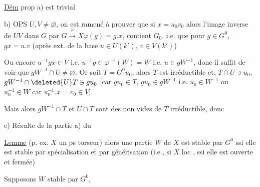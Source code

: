 
\uline{Dém} prop \qquad a) est trivial \qquad{}

b)  OPS $U,V\ne\varnothing$,  on est ramené à prouver que si  $x=u_0v_0$   alors l'image inverse de $UV$ dans $G$ par $G\xrightarrow{\varphi}X$\quad $\varphi(g)=g.x$,  contient $G_0$. i.e. que pour $g\in G^0$, \unsure{\ldots} $gx=u.v$ (après ext. de la base  $u\in U(k')$, $v\in V(k')$)

 Ou encore $u^{-1}gx\in V$ i.e. $u^{-1}g\in\varphi^{-1}(W)=W$ i.e.  $u\in gW^{-1}$, donc il suffit de voir que $gW^{-1}\cap U\ne\varnothing$. Or soit $T=G^0u_0$, alors  $T$ est irréductible et,  $T\cap U\ni u_0$, $gW^{-1}\cap\deleted{U}T\ni gu_0$ [car $gu_0\in T$, $gu_0\in gW^{-1}$ i.e. $u_0\in W^{-1}$ ou $u_0^{-1}\in W$ car $u_0^{-1}.x=v_0\in V$].

Mais alors $gW^{-1}\cap T$ et $U\cap T$ sont des  non vides de $T$ irréductible, donc  

c) Résulte de la partie a) du

\uline{Lemme}    (p. ex. $X$ un ps torseur) alors une partie $W$ de $X$ est stable par $G^0$ ssi elle est stable par spécialisation et par générisation (i.e., si $X$ loc , ssi elle est ouverte et fermée)

  Supposons $W$ stable par $G^0$,       

